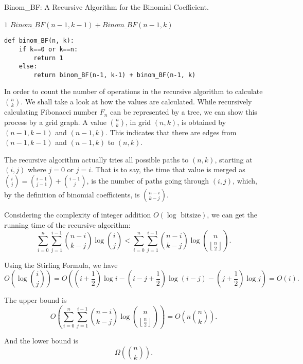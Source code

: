 \documentclass[UTF8, a4paper, linespread=1.5]{article}
\begin{document}
\begin{algorithm}
    \caption{Binom\_BF: A Recursive Algorithm for the Binomial Coefficient.}
    \begin{algorithmic}
        \RETURN $1$
        \ELSE
        \RETURN $Binom\_BF(n-1, k-1) + Binom\_BF(n-1, k)$
        \ENDIF
    \end{algorithmic}
\end{algorithm}

\begin{verbatim}
def binom_BF(n, k):
    if k==0 or k==n:
        return 1
    else:
        return binom_BF(n-1, k-1) + binom_BF(n-1, k)
\end{verbatim}

In order to count the number of operations in the recursive algorithm to calculate $\displaystyle \binom n k$. We shall take a look at how the values are calculated. While recursively calculating Fibonacci number $F_n$ can be represented by a tree, we can show this process by a grid graph. A value $\displaystyle \binom n k$, in grid $(n, k)$, is obtained by $(n-1, k-1)$ and $(n-1, k)$. This indicates that there are edges from $(n-1, k-1)$ and $(n-1, k)$ to $(n, k)$.

The recursive algorithm actually tries all possible paths to $(n, k)$, starting at $(i, j)$ where $j = 0$ or $j = i$. That is to say, the time that value is merged as $\displaystyle \binom i j = \binom {i-1}{j-1} + \binom {i-1} j$, is the number of paths going through $(i, j)$, which, by the definition of binomial coefficients, is $\displaystyle \binom {n-i}{k-j}$.

Considering the complexity of integer addition $O(\log \text{ bitsize})$, we can get the running time of the recursive algorithm: $$\sum_{i=0}^n\sum_{j=1}^{i-1} \binom {n-i}{k-j} \log  \binom i j < \sum_{i=0}^n\sum_{j=1}^{i-1} \binom {n-i}{k-j} \log  \binom n {\left\lfloor \frac{n}{2} \right\rfloor }.$$

Using the Stirling Formula, we have
$$O( \log \binom i j) = O((i+\frac{1}{2})\log i-(i-j+\frac{1}{2})\log (i-j)-(j+\frac{1}{2})\log j) = O(i).$$

The upper bound is
$$O(\sum_{i=0}^n\sum_{j=1}^{i-1} \binom {n-i}{k-j} \log  \binom n {\left\lfloor \frac{n}{2} \right\rfloor }) = O(n \binom n k).$$

And the lower bound is
$$\Omega(\binom nk).$$
\end{document}
